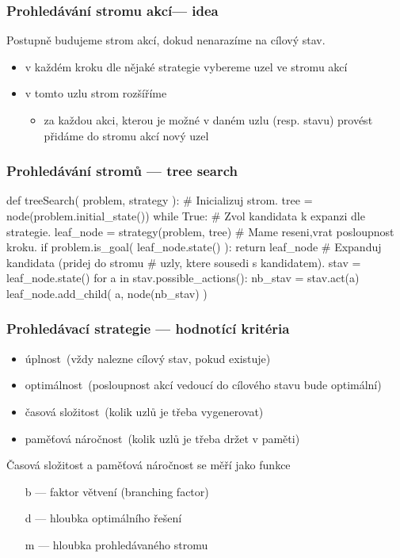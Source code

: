 \documentclass[red,professionalfont]{beamer}
\theoremstyle{definition}
\newcommand{\0}{\mbox{${\bf 0}$}}
\begin{document}
\begin{frame}\frametitle{Prohledávání stromu akcí--- idea}
\begin{block}{}
 Postupně budujeme strom akcí, dokud nenarazíme na cílový stav.
\end{block}\pause
 \begin{itemize}
  \item v každém kroku dle nějaké strategie vybereme uzel ve stromu akcí\pause
  \item v tomto uzlu strom rozšíříme\pause
  \begin{itemize}
    \item za každou akci, kterou je možné v daném uzlu (resp. stavu) provést
          přidáme do stromu akcí nový uzel
  \end{itemize}
 \end{itemize}
\end{frame}

\begin{frame}[fragile]\frametitle{Prohledávání stromů --- tree search}
\begin{python}
def treeSearch( problem, strategy ):
    # Inicializuj strom.
    tree = node(problem.initial_state())
    while True:
      # Zvol kandidata k expanzi dle strategie.
      leaf_node = strategy(problem, tree)
      # Mame reseni,vrat posloupnost kroku.
      if problem.is_goal( leaf_node.state() ):
        return leaf_node
      # Expanduj kandidata (pridej do stromu 
      # uzly, ktere sousedi s kandidatem).
      stav = leaf_node.state()
      for a in stav.possible_actions():
        nb_stav = stav.act(a)
        leaf_node.add_child( a, node(nb_stav) )
\end{python}
\end{frame}

\begin{frame}\frametitle{Prohledávací strategie --- hodnotící kritéria}

\begin{itemize}
 \item úplnost\pause\ (vždy nalezne cílový stav, pokud existuje)\pause
 \item optimálnost\pause\ (posloupnost akcí vedoucí do cílového stavu bude optimální)\pause
 \item časová složitost\pause\ (kolik uzlů je třeba vygenerovat)\pause
 \item paměťová náročnost\pause\ (kolik uzlů je třeba držet v paměti)\pause
\end{itemize}

Časová složitost a paměťová náročnost se měří jako funkce\pause
\begin{itemize}
 \item[b] --- faktor větvení (branching factor)\pause
 \item[d] --- hloubka optimálního řešení\pause
 \item[m] --- hloubka prohledávaného stromu
\end{itemize}

\end{frame}
\end{document}
